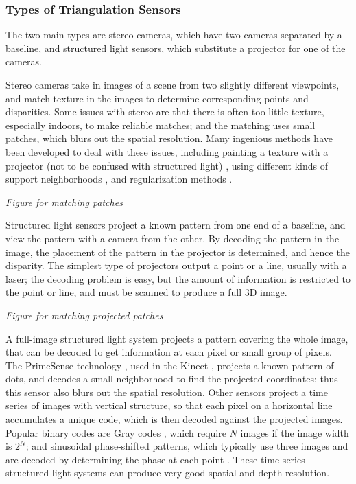 \documentclass[twocolumn,oneside]{book}
\begin{document}
\subsubsection{Types of Triangulation Sensors}

The two main types are stereo cameras, which have two cameras
separated by a baseline, and structured light sensors, which
substitute a projector for one of the cameras.

Stereo cameras take in images of a scene from two slightly different
viewpoints, and match texture in the images to determine corresponding
points and disparities.  Some issues with stereo are that there is
often too little texture, especially indoors, to make reliable
matches; and the matching uses small patches, which blurs out the
spatial resolution.  Many ingenious methods have been developed to
deal with these issues, including painting a texture with a projector
(not to be confused with structured light) \cite{}, using different
kinds of support neighborhoods \cite{}, and regularization methods
\cite{}.

{\em Figure for matching patches}

Structured light sensors project a known pattern from one end of a
baseline, and view the pattern with a camera from the other.  By
decoding the pattern in the image, the placement of the pattern in the
projector is determined, and hence the disparity.  The simplest type
of projectors output a point or a line, usually with a laser; the
decoding problem is easy, but the amount of information is restricted
to the point or line, and must be scanned to produce a full 3D image.

{\em Figure for matching projected patches}

A full-image structured light system projects a pattern covering the
whole image, that can be decoded to get information at each pixel or
small group of pixels.  The PrimeSense technology \cite{}, used in the
Kinect \cite{}, projects a known pattern of dots, and decodes a small
neighborhood to find the projected coordinates; thus this sensor also
blurs out the spatial resolution.  Other sensors project a time series
of images with vertical structure, so that each pixel on a horizontal
line accumulates a unique code, which is then decoded against the
projected images.  Popular binary codes are Gray codes \cite{}, which
require $N$ images if the image width is $2^N$; and sinusoidal
phase-shifted patterns, which typically use three images and are
decoded by determining the phase at each point \cite{}.  These
time-series structured light systems can produce very good spatial and
depth resolution.
\end{document}
